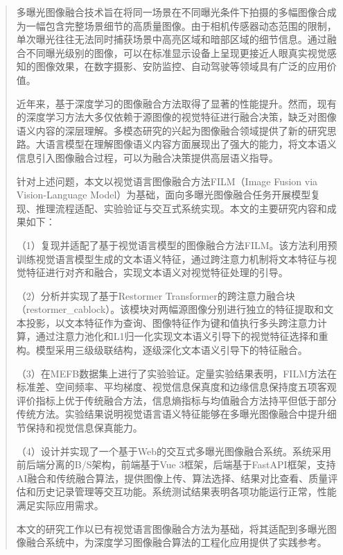 \newcommand{\keywordsCn}[1][图像融合；多曝光融合；视觉语言模型；深度学习；跨注意力机制；Restormer]{#1}
\begin{abstract}
\noindent\hspace*{2\ccwd}多曝光图像融合技术旨在将同一场景在不同曝光条件下拍摄的多幅图像合成为一幅包含完整场景细节的高质量图像。由于相机传感器动态范围的限制，单次曝光往往无法同时捕获场景中高亮区域和暗部区域的细节信息。通过融合不同曝光级别的图像，可以在标准显示设备上呈现更接近人眼真实视觉感知的图像效果，在数字摄影、安防监控、自动驾驶等领域具有广泛的应用价值。

近年来，基于深度学习的图像融合方法取得了显著的性能提升。然而，现有的深度学习方法大多仅依赖于源图像的视觉特征进行融合决策，缺乏对图像语义内容的深层理解。多模态研究的兴起为图像融合领域提供了新的研究思路。大语言模型在理解图像语义内容方面展现出了强大的能力，将文本语义信息引入图像融合过程，可以为融合决策提供高层语义指导。

针对上述问题，本文以视觉语言图像融合方法FILM（Image Fusion via Vision-Language Model）为基础，面向多曝光图像融合任务开展模型复现、推理流程适配、实验验证与交互式系统实现。本文的主要研究内容和成果如下：

（1）复现并适配了基于视觉语言模型的图像融合方法FILM。该方法利用预训练视觉语言模型生成的文本语义特征，通过跨注意力机制将文本特征与视觉特征进行对齐和融合，实现文本语义对视觉特征处理的引导。

（2）分析并实现了基于Restormer Transformer的跨注意力融合块（restormer\_cablock）。该模块对两幅源图像分别进行独立的特征提取和文本投影，以文本特征作为查询、图像特征作为键和值执行多头跨注意力计算，通过注意力池化和L1归一化实现文本语义引导下的视觉特征选择和重构。模型采用三级级联结构，逐级深化文本语义引导下的特征融合。

（3）在MEFB数据集上进行了实验验证。定量实验结果表明，FILM方法在标准差、空间频率、平均梯度、视觉信息保真度和边缘信息保持度五项客观评价指标上优于传统融合方法，信息熵指标与均值融合方法持平但低于部分传统方法。实验结果说明视觉语言语义特征能够在多曝光图像融合中提升细节保持和视觉信息保真能力。

（4）设计并实现了一个基于Web的交互式多曝光图像融合系统。系统采用前后端分离的B/S架构，前端基于Vue 3框架，后端基于FastAPI框架，支持AI融合和传统融合算法，提供图像上传、算法选择、结果对比查看、质量评估和历史记录管理等交互功能。系统测试结果表明各项功能运行正常，性能满足实际应用需求。

本文的研究工作以已有视觉语言图像融合方法为基础，将其适配到多曝光图像融合系统中，为深度学习图像融合算法的工程化应用提供了实践参考。
\end{abstract}

